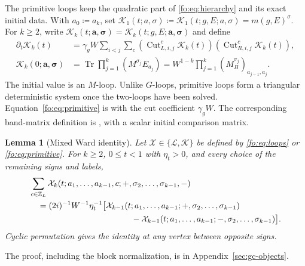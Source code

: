 \documentclass[11pt]{article}
\numberwithin{equation}{section}
\newtheorem{lemma}[theorem]{Lemma}
\theoremstyle{remark}
\newcommand{\Z}{\mathbb Z}
\newcommand{\Tr}{\operatorname{Tr}}
\newcommand{\cL}{\mathcal L}
\newcommand{\cK}{\mathcal K}
\begin{document}
The primitive loops keep the quadratic part of
\eqref{fo:eq:hierarchy} and its exact initial data. With \(a_0\coloneqq a_k\), set
$\cK_1(t;a,\sigma)\coloneqq\cK_1(t;g,E;a,\sigma)=m(g,E)^\sigma$.
For $k\ge2$, write
$\cK_k(t;\boldsymbol a,\boldsymbol\sigma)
=\cK_k(t;g,E;\boldsymbol a,\boldsymbol\sigma)$ and define
\begin{equation}\label{fo:eq:primitive}
 \begin{split}
 \partial_t\cK_k(t)
 &=\gamma_g W\sum_{i<j}\sum_c
       (\operatorname{Cut}_{L,i,j}^c\cK_k(t))
       (\operatorname{Cut}_{R,i,j}^c\cK_k(t)),\\
 \cK_k(0;\boldsymbol a,\boldsymbol\sigma)
 &=\Tr\prod_{j=1}^k(M^{\sigma_j}E_{a_j})
   =W^{1-k}\prod_{j=1}^k(M_B^{\sigma_j})_{a_{j-1},a_j}.
 \end{split}
\end{equation}
The initial value is an \(M\)-loop. Unlike \(G\)-loops, primitive
loops form a triangular deterministic system once the two-loops have
been solved. Equation~\eqref{fo:eq:primitive} is
\cite[Definition~3.7, (3.27)--(3.29)]{TYY} with the cut coefficient
$\gamma_g W$. The corresponding band-matrix definition is
\cite[Definition~2.12, (2.48)]{YY}, with a scalar initial comparison matrix.

\begin{lemma}[Mixed Ward identity]\label{fo:lem:mixed-ward}
Let $\mathcal X\in\{\cL,\cK\}$ be defined by \eqref{fo:eq:loops} or
\eqref{fo:eq:primitive}. For $k\ge2$, $0\le t<1$ with $\eta_t>0$,
and every choice of the remaining signs and labels,
\begin{equation}\label{gc:eq:ward}
 \begin{split}
 &\sum_{c\in\Z_L}\mathcal X_k
    (t;a_1,\ldots,a_{k-1},c;+,\sigma_2,\ldots,\sigma_{k-1},-)\\
 &\quad=(2i)^{-1}W^{-1}\eta_t^{-1}\bigl[
   \mathcal X_{k-1}(t;a_1,\ldots,a_{k-1};+,\sigma_2,\ldots,\sigma_{k-1})\\
 &\hspace{43mm}-
   \mathcal X_{k-1}(t;a_1,\ldots,a_{k-1};-,\sigma_2,\ldots,\sigma_{k-1})
   \bigr].
 \end{split}
\end{equation}
Cyclic permutation gives the identity at any vertex between opposite
signs.
\end{lemma}
The proof, including the block normalization, is in
Appendix~\ref{sec:gc-objects}.
\end{document}
